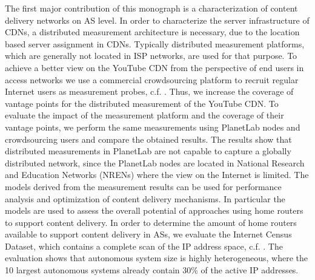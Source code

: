 

The first major contribution of this monograph is a characterization of content delivery networks on AS level.
In order to characterize the server infrastructure of CDNs, a distributed measurement architecture is necessary, due to the location based server assignment in CDNs.
Typically distributed measurement platforms, which are generally not located in ISP networks, are used for that purpose.
To achieve a better view on the YouTube CDN from the perspective of end users in access networks we use a commercial crowdsourcing platform to recruit regular Internet users as measurement probes, c.f. \cite{burger2014vantage}.
Thus, we increase the coverage of vantage points for the distributed measurement of the YouTube CDN.
To evaluate the impact of the measurement platform and the coverage of their vantage points, we perform the same measurements using PlanetLab nodes and crowdsourcing users and compare the obtained results.
The results show that distributed measurements in PlanetLab are not capable to capture a globally distributed network, since the PlanetLab nodes are located in National Research and Education Networks (NRENs) where the view on the Internet is limited.
The models derived from the measurement results can be used for performance analysis and optimization of content delivery mechanisms.
In particular the models are used to assess the overall potential of approaches using home routers to support content delivery.
In order to determine the amount of home routers available to support content delivery in ASs, we evaluate the Internet Census Dataset, which contains a complete scan of the IP address space, c.f. \cite{burger2016hierarchical}.
The evaluation shows that autonomous system size is highly heterogeneous, where the 10 largest autonomous systems already contain 30\% of the active IP addresses.
